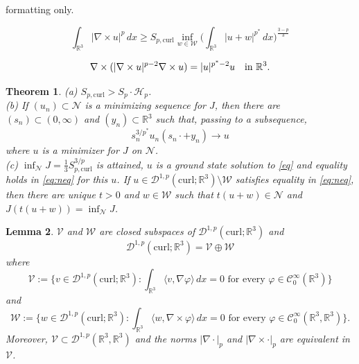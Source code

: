 \documentclass[10pt,a4paper]{amsart}
\newtheorem{Th}{Theorem}[section]
\newtheorem{Lem}[Th]{Lemma}
\def\R{\mathbb{R}}
\def\curl{\mathrm{curl}}
\def\V{\mathcal{V}}
\def\Wc{\mathscr{W}}
\def\W{\mathcal{W}}
\newcommand{\cC}{{\mathcal C}}
\newcommand{\cD}{{\mathcal D}}
\newcommand{\cH}{{\mathcal H}}
\newcommand{\cN}{{\mathcal N}}
\newcommand{\cV}{{\mathcal V}}
\newcommand{\cW}{{\mathcal W}}
\def\r{\mathbb{R}}
\def\r3{\mathbb{R}^3}
\def\Wc{\cD^{1,p}(\curl;\R^3)}
\def\curlop{\nabla\times}
\numberwithin{equation}{section}
\begin{document}
formatting only.\par\smallskip
\setcounter{section}{1}
\setcounter{equation}{3}
\setcounter{Th}{0}
\begin{equation}\label{eq:neq}
\int_{\r3}|\curlop u|^p\, dx\geq S_{p,\curl}\inf_{w\in \cW}\Big(\int_{\r3}|u+w|^{p^*}\,dx\Big)^{\frac{3-p}{3}}
\end{equation}

\setcounter{section}{1}
\setcounter{equation}{5}
\setcounter{Th}{0}
\begin{equation}
\label{eq}
\curlop (|\curlop u|^{p-2}\curlop u)= |u|^{p^*-2}u\quad \hbox{in }\R^3.
\end{equation}

\setcounter{section}{1}
\setcounter{equation}{11}
\setcounter{Th}{0}
\begin{Th}\label{Th:main1}
(a) $S_{p,\curl} > S_p\cdot\cH_p$. \\
(b)  If $(u_n)\subset \cN$ is a minimizing sequence for $J$, then there are $(s_n)\subset (0,\infty)$ and $(y_n)\subset \R^3$ such that, passing to a subsequence, 
$$
s_n^{3/p^*}u_n(s_n\cdot+y_n)\to u
$$ 
where $u$ is a minimizer for $J$ on $\cN$.\\
(c) $\inf_{\cN}J=\frac13S_{p,\curl}^{3/p}$ is attained,  $u$ is a ground state solution to \eqref{eq} and equality holds in \eqref{eq:neq} for this $u$. If $u\in\Wc\setminus\cW$ satisfies equality in \eqref{eq:neq}, then there are unique $t>0$ and $w\in\cW$ such that $t(u+w)\in\cN$ and $J(t(u+w))=\inf_{\cN} J$.
\end{Th}

\setcounter{section}{2}
\setcounter{equation}{0}
\setcounter{Th}{0}
\begin{Lem}\label{defof} $\V$ and $\cW$ are closed subspaces of $\Wc$  and
	\begin{equation}\label{HelmholzDec}
	\Wc=\V\oplus \W
	\end{equation}
where $$\cV:=\Big\{v\in \Wc: \int_{\R^3}\langle v,\nabla \varphi\rangle\,dx=0
\text{ for every $\varphi\in \cC^\infty_0(\R^3)$} \Big\}$$
and
$$
\cW:=\Big\{w\in \Wc: \int_{\R^3}\langle w,\curlop \varphi\rangle\,dx=0
\text{ for every $\varphi\in \cC^\infty_0(\R^3,\R^3)$} \Big\}.
$$
Moreover, $\cV\subset\cD^{1,p}(\r3,\r3)$ and the norms $|\nabla \cdot|_p$ and $|\curlop \cdot|_p$ are equivalent in $\V$. 
\end{Lem}
\end{document}
